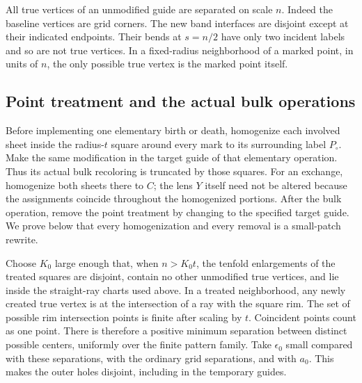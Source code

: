\documentclass[11pt]{article}
\numberwithin{equation}{section}
\theoremstyle{definition}
\theoremstyle{remark}
\begin{document}
All true vertices of an unmodified guide are separated on scale $n$.
Indeed the baseline vertices are grid corners.  The new band interfaces
are disjoint except at their indicated endpoints.  Their bends at
$s=n/2$ have only two incident labels and so are not true vertices.
In a fixed-radius neighborhood of a marked point, in units of $n$,
the only possible true vertex is the marked point itself.

\subsection{Point treatment and the actual bulk operations}

Before implementing one elementary birth or death, homogenize each
involved sheet inside the radius-$t$ square around every mark to its
surrounding label $P_\circ$.  Make the same modification in the target
guide of that elementary operation.  Thus its actual bulk recoloring
is truncated by those squares.  For an exchange, homogenize both
sheets there to $C$; the lens $Y$ itself need not be altered because
the assignments coincide throughout the homogenized portions.  After
the bulk operation, remove the point treatment by changing to the
specified target guide.  We prove below that every homogenization and
every removal is a small-patch rewrite.

Choose $K_0$ large enough that, when $n>K_0t$, the tenfold enlargements
of the treated squares are disjoint, contain no other unmodified true
vertices, and lie inside the straight-ray charts used above.  In a
treated neighborhood, any newly created true vertex is at the
intersection of a ray with the square rim.  The set of possible rim
intersection points is finite after scaling by $t$.  Coincident
points count as one point.  There is therefore a positive minimum
separation between distinct possible centers, uniformly over the
finite pattern family.  Take $\epsilon_0$ small compared with these
separations, with the ordinary grid separations, and with $a_0$.
This makes the outer holes disjoint, including in the temporary guides.
\end{document}
